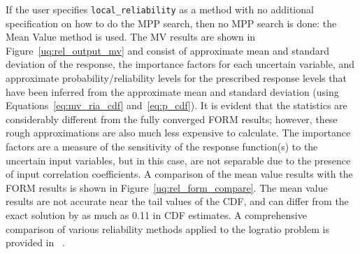 If the user specifies \texttt{local\_reliability} as a method 
with no additional specification on how to do the MPP search, then no 
MPP search is done: the Mean Value method is used.  The MV results are
shown in Figure~\ref{uq:rel_output_mv} and consist of approximate mean
and standard deviation of the response, the importance factors for
each uncertain variable, and approximate probability/reliability
levels for the prescribed response levels that have been inferred from
the approximate mean and standard deviation (using
Equations~\ref{eq:mv_ria_cdf} and~\ref{eq:p_cdf}). It is evident that
the statistics are considerably different from the fully converged
FORM results; however, these rough approximations are also much less
expensive to calculate. The importance factors are a measure of the
sensitivity of the response function(s) to the uncertain input
variables, but in this case, are not separable due to the presence of
input correlation coefficients. A comparison of the mean value results 
with the FORM results is shown in Figure~\ref{uq:rel_form_compare}. 
The mean value results are not accurate near the tail values of the CDF, 
and can differ from the exact solution by as much as 0.11 in CDF estimates.
A comprehensive comparison of
various reliability methods applied to the logratio problem 
is provided in ~\cite{Eld06a}.

